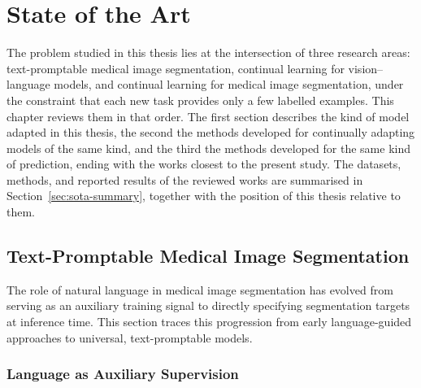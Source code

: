 %
%

\chapter{State of the Art}

The problem studied in this thesis lies at the intersection of three research areas: text-promptable medical image segmentation, continual learning for vision--language models, and continual learning for medical image segmentation, under the constraint that each new task provides only a few labelled examples. This chapter reviews them in that order. The first section describes the kind of model adapted in this thesis, the second the methods developed for continually adapting models of the same kind, and the third the methods developed for the same kind of prediction, ending with the works closest to the present study. The datasets, methods, and reported results of the reviewed works are summarised in Section~\ref{sec:sota-summary}, together with the position of this thesis relative to them.

\section{Text-Promptable Medical Image Segmentation}
\label{sec:text-promptable-seg}

The role of natural language in medical image segmentation has evolved from serving as an auxiliary training signal to directly specifying segmentation targets at inference time. This section traces this progression from early language-guided approaches to universal, text-promptable models.

\subsection{Language as Auxiliary Supervision}

